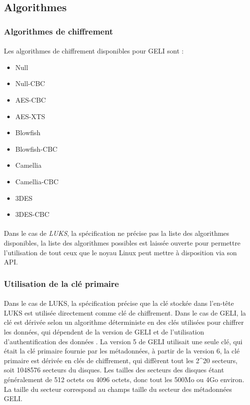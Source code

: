 \subsection{Algorithmes}
\subsubsection{Algorithmes de chiffrement}
\paragraph{}
Les algorithmes de chiffrement disponibles pour GELI \cite{geli.h} sont :
\begin{itemize}
	\item Null
	\item Null-CBC
	\item AES-CBC
	\item AES-XTS
	\item Blowfish
	\item Blowfish-CBC
	\item Camellia
	\item Camellia-CBC
	\item 3DES
	\item 3DES-CBC
\end{itemize}

\paragraph{}
Dans le cas de {\em LUKS}, la spécification \cite{onDiskFormatLuks}
ne précise pas la liste des algorithmes disponibles, la liste des algorithmes 
possibles est laissée ouverte pour permettre l'utilisation de tout ceux que le 
noyau Linux peut mettre à disposition via son API.

\subsubsection{Utilisation de la clé primaire}
\paragraph{}
Dans le cas de LUKS, la spécification \cite{onDiskFormatLuks} précise que la 
clé stockée dans l'en-tête LUKS est utilisée directement comme clé de 
chiffrement. Dans le cas de GELI, la clé est dérivée selon un algorithme 
déterministe en des clés utilisées pour chiffrer les données, qui dépendent de 
la version de GELI et de l'utilisation d'authentification des données 
\cite{manGeli}. La version 5 de GELI utilisait une seule clé, qui était la clé
primaire fournie par les métadonnées, à partir de la version 6, la clé primaire
est dérivée en clés de chiffrement, qui diffèrent tout les 2\textasciicircum20 
secteurs, soit 1048576 secteurs du disques. Les tailles des secteurs des 
disques étant généralement de 512 octets ou 4096 octets, 
donc tout les 500Mo ou 4Go environ.
La taille du secteur correspond au champs taille du secteur des métadonnées
GELI.

